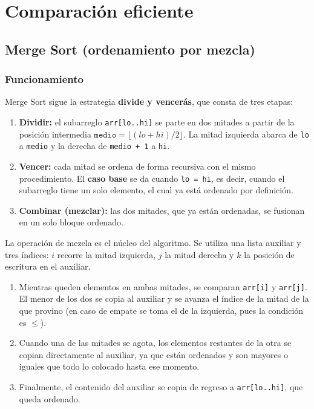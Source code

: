 \documentclass[11pt,letterpaper]{article}
\begin{document}
\clearpage

\section{Comparación eficiente}

\subsection{Merge Sort (ordenamiento por mezcla)}
\subsubsection{Funcionamiento}

Merge Sort sigue la estrategia \textbf{divide y vencerás}, que consta de tres etapas:

\begin{enumerate}
  \item \textbf{Dividir:} el subarreglo \texttt{arr[lo..hi]} se parte en dos mitades a partir de la posición intermedia $\texttt{medio} = \lfloor (lo + hi)/2 \rfloor$. La mitad izquierda abarca de \texttt{lo} a \texttt{medio} y la derecha de \texttt{medio + 1} a \texttt{hi}.
  \item \textbf{Vencer:} cada mitad se ordena de forma recursiva con el mismo procedimiento. El \textbf{caso base} se da cuando \texttt{lo = hi}, es decir, cuando el subarreglo tiene un solo elemento, el cual ya está ordenado por definición.
  \item \textbf{Combinar (mezclar):} las dos mitades, que ya están ordenadas, se fusionan en un solo bloque ordenado.
\end{enumerate}

La operación de mezcla es el núcleo del algoritmo. Se utiliza una lista auxiliar y tres índices: $i$ recorre la mitad izquierda, $j$ la mitad derecha y $k$ la posición de escritura en el auxiliar.

\begin{enumerate}
  \item Mientras queden elementos en ambas mitades, se comparan \texttt{arr[i]} y \texttt{arr[j]}. El menor de los dos se copia al auxiliar y se avanza el índice de la mitad de la que provino (en caso de empate se toma el de la izquierda, pues la condición es $\leq$).
  \item Cuando una de las mitades se agota, los elementos restantes de la otra se copian directamente al auxiliar, ya que están ordenados y son mayores o iguales que todo lo colocado hasta ese momento.
  \item Finalmente, el contenido del auxiliar se copia de regreso a \texttt{arr[lo..hi]}, que queda ordenado.
\end{enumerate}
\end{document}
